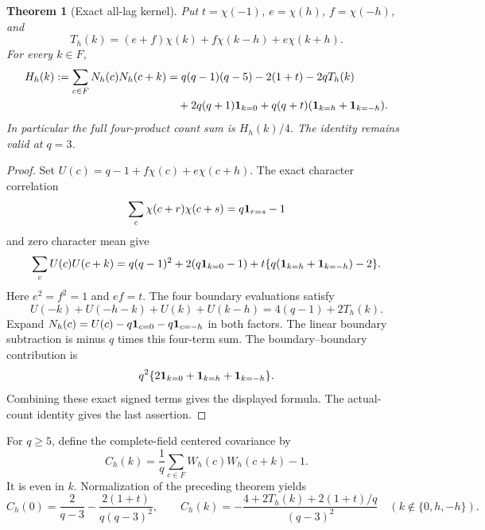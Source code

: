\documentclass[11pt]{article}
\newtheorem{theorem}{Theorem}[section]
\begin{document}
\begin{theorem}[Exact all-lag kernel]\label{thm:trace-free-all-lag}
Put \(t=\chi(-1)\), \(e=\chi(h)\), \(f=\chi(-h)\), and
\[
 T_h(k)=(e+f)\chi(k)+f\chi(k-h)+e\chi(k+h).
\]
For every \(k\in F\),
\begin{align*}
 H_h(k):=\sum_{c\in F}N_h(c)N_h(c+k)
 &=q(q-1)(q-5)-2(1+t)-2qT_h(k)\\
 &\quad+2q(q+1){\bf1}_{k=0}
       +q(q+t)({\bf1}_{k=h}+{\bf1}_{k=-h}).
\end{align*}
In particular the full four-product count sum is \(H_h(k)/4\).
The identity remains valid at \(q=3\).
\end{theorem}
\begin{proof}
Set \(U(c)=q-1+f\chi(c)+e\chi(c+h)\).
The exact character correlation
\[
 \sum_c\chi(c+r)\chi(c+s)=q{\bf1}_{r=s}-1
\]
and zero character mean give
\[
 \sum_cU(c)U(c+k)
 =q(q-1)^2+2(q{\bf1}_{k=0}-1)
   +t\{q({\bf1}_{k=h}+{\bf1}_{k=-h})-2\}.
\]
Here \(e^2=f^2=1\) and \(ef=t\).
The four boundary evaluations satisfy
\[
 U(-k)+U(-h-k)+U(k)+U(k-h)=4(q-1)+2T_h(k).
\]
Expand \(N_h(c)=U(c)-q{\bf1}_{c=0}-q{\bf1}_{c=-h}\)
in both factors. The linear boundary subtraction is minus \(q\) times
this four-term sum. The boundary--boundary contribution is
\[
 q^2\{2{\bf1}_{k=0}+{\bf1}_{k=h}+{\bf1}_{k=-h}\}.
\]
Combining these exact signed terms gives the displayed formula.
The actual-count identity gives the last assertion.
\end{proof}

For \(q\ge5\), define the complete-field centered covariance by
\[
 C_h(k)=\frac1q\sum_{c\in F}W_h(c)W_h(c+k)-1.
\]
It is even in \(k\). Normalization of the preceding theorem yields
\[
 C_h(0)=\frac2{q-3}-\frac{2(1+t)}{q(q-3)^2},\qquad
 C_h(k)=-\frac{4+2T_h(k)+2(1+t)/q}{(q-3)^2}
 \quad(k\notin\{0,h,-h\}).
\]
\end{document}
